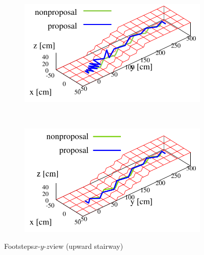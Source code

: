 \documentclass[autodetect-engine,dvipdfmx-if-dvi,ja=standard,a4j,jbase=11pt,magstyle=nomag*]{bxjsreport}
\begin{document}
\begin{figure}[pt]%
    \centering%
    \begin{subfigure}[c]{\linewidth}
        \centering%
        \includegraphics[width=0.9\linewidth, clip]{./figure/sim_hrp2_stair_upbad_xyz.pdf}%
        \label{fig:sim_hrp2_stair_upbad_xyz}%
    \end{subfigure}\\ %
    \vfil%
    \begin{subfigure}[c]{\linewidth}
        \centering%
        \includegraphics[width=0.9\linewidth, clip]{./figure/sim_hrp2_stair_up_xyz.pdf}%
        \label{fig:sim_hrp2_stair_upgood_xyz}%
    \end{subfigure}%
    \caption{Footsteps$x$-$y$-$z$view (upward stairway)}%
    \label{fig:sim_hrp2_stair_up}%
\end{figure}
\end{document}
